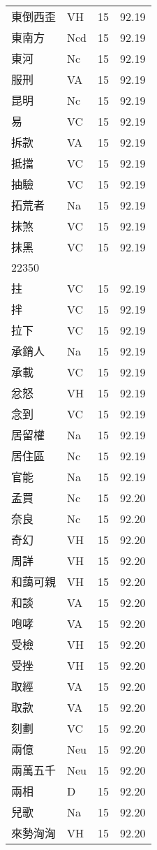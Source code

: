 \documentclass[twocolumn]{book}
\begin{document}
\begin{supertabular}{llrr}
東倒西歪 & VH & 15 &  92.19\\
東南方 & Ncd & 15 &  92.19\\
東河 & Nc & 15 &  92.19\\
服刑 & VA & 15 &  92.19\\
昆明 & Nc & 15 &  92.19\\
易 & VC & 15 &  92.19\\
拆款 & VA & 15 &  92.19\\
抵擋 & VC & 15 &  92.19\\
抽驗 & VC & 15 &  92.19\\
拓荒者 & Na & 15 &  92.19\\
抹煞 & VC & 15 &  92.19\\
抹黑 & VC & 15 &  92.19\\
22350\\
拄 & VC & 15 &  92.19\\
拌 & VC & 15 &  92.19\\
拉下 & VC & 15 &  92.19\\
承銷人 & Na & 15 &  92.19\\
承載 & VC & 15 &  92.19\\
忿怒 & VH & 15 &  92.19\\
念到 & VC & 15 &  92.19\\
居留權 & Na & 15 &  92.19\\
居住區 & Nc & 15 &  92.19\\
官能 & Na & 15 &  92.19\\
孟買 & Nc & 15 &  92.20\\
奈良 & Nc & 15 &  92.20\\
奇幻 & VH & 15 &  92.20\\
周詳 & VH & 15 &  92.20\\
和藹可親 & VH & 15 &  92.20\\
和談 & VA & 15 &  92.20\\
咆哮 & VA & 15 &  92.20\\
受檢 & VH & 15 &  92.20\\
受挫 & VH & 15 &  92.20\\
取經 & VA & 15 &  92.20\\
取款 & VA & 15 &  92.20\\
刻劃 & VC & 15 &  92.20\\
兩億 & Neu & 15 &  92.20\\
兩萬五千 & Neu & 15 &  92.20\\
兩相 & D & 15 &  92.20\\
兒歌 & Na & 15 &  92.20\\
來勢洶洶 & VH & 15 &  92.20\\

\end{supertabular}
\end{document}
